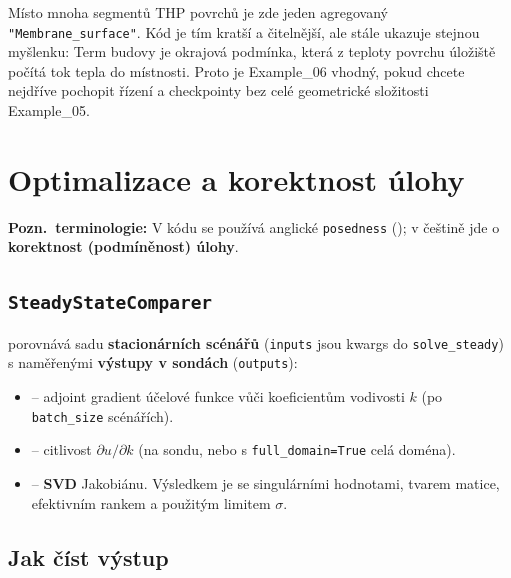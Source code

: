 \documentclass[a4paper,11pt]{article}
\begin{document}
Místo mnoha segmentů THP povrchů je zde jeden agregovaný
\texttt{"Membrane\_surface"}. Kód je tím kratší a čitelnější, ale stále ukazuje
stejnou myšlenku: Term budovy je okrajová podmínka, která z teploty povrchu
úložiště počítá tok tepla do místnosti. Proto je Example\_06 vhodný, pokud chcete
nejdříve pochopit řízení a checkpointy bez celé geometrické složitosti Example\_05.

\section{Optimalizace a korektnost úlohy}\label{sec:opt}

\begin{noteblock}
\textbf{Pozn.\ terminologie:} V kódu se používá anglické \texttt{posedness}
(); v češtině jde o
\textbf{korektnost (podmíněnost) úlohy}.
\end{noteblock}

\subsection*{\texttt{SteadyStateComparer}}

 porovnává sadu
\textbf{stacionárních scénářů} (\texttt{inputs} jsou kwargs do
\texttt{solve\_steady}) s naměřenými \textbf{výstupy v sondách}
(\texttt{outputs}):

\begin{itemize}
  \item {} -- adjoint gradient
        účelové funkce vůči koeficientům vodivosti \(k\) (po
        \texttt{batch\_size} scénářích).
  \item {} -- citlivost
        \(\partial u / \partial k\) (na sondu, nebo s
        \texttt{full\_domain=True} celá doména).
  \item {} -- \textbf{SVD} Jakobiánu.
        Výsledkem je  se singulárními hodnotami,
        tvarem matice, efektivním rankem a použitým limitem \(\sigma\).
\end{itemize}

\subsection*{Jak číst výstup}
\end{document}
